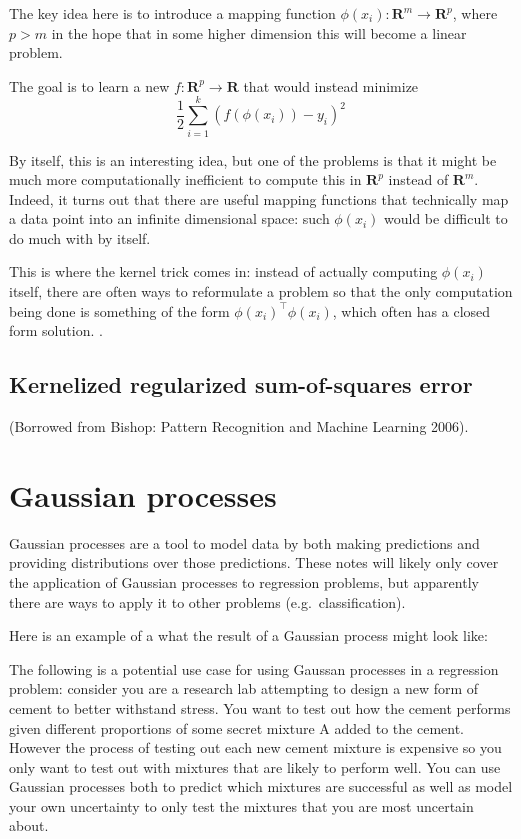 \documentclass[answers,12pt]{exam}
\begin{document}
The key idea here is to introduce a mapping function $\phi(x_i): \mathbf{R}^m \to \mathbf{R}^p$, where $p>m$ in the hope that in some higher dimension this will become a linear problem. 

The goal is to learn a new $f: \mathbf{R}^p \to \mathbf{R}$ that would instead minimize
\[
    \frac{1}{2}\sum_{i=1}^{k}{(f(\phi(x_i))-y_i)}^2
\]

By itself, this is an interesting idea, but one of the problems is that it might be much more computationally inefficient to compute this in $\mathbf{R}^p$ instead of $\mathbf{R}^m$. 
Indeed, it turns out that there are useful mapping functions that technically map a data point into an infinite dimensional space: such $\phi(x_i)$ would be difficult to do much with by itself.

This is where the kernel trick comes in:
instead of actually computing $\phi(x_i)$ itself, there are often ways to reformulate a problem so that the only computation being done is something of the form $\phi(x_i)^{\top}\phi(x_i)$, which often has a closed form solution. .

\subsection{Kernelized regularized sum-of-squares error}
(Borrowed from Bishop: Pattern Recognition and Machine Learning 2006).


\section{Gaussian processes}
Gaussian processes are a tool to model data by both making predictions and providing distributions over those predictions.
These notes will likely only cover the application of Gaussian processes to regression problems, but apparently there are ways to apply it to other problems (e.g.\ classification).

Here is an example of a what the result of a Gaussian process might look like:


The following is a potential use case for using Gaussan processes in a regression problem:
consider you are a research lab attempting to design a new form of cement to better withstand stress.
You want to test out how the cement performs given different proportions of some secret mixture A added to the cement.
However the process of testing out each new cement mixture is expensive so you only want to test out with mixtures that are likely to perform well.
You can use Gaussian processes both to predict which mixtures are successful as well as model your own uncertainty to only test the mixtures that you are most uncertain about.
\end{document}
